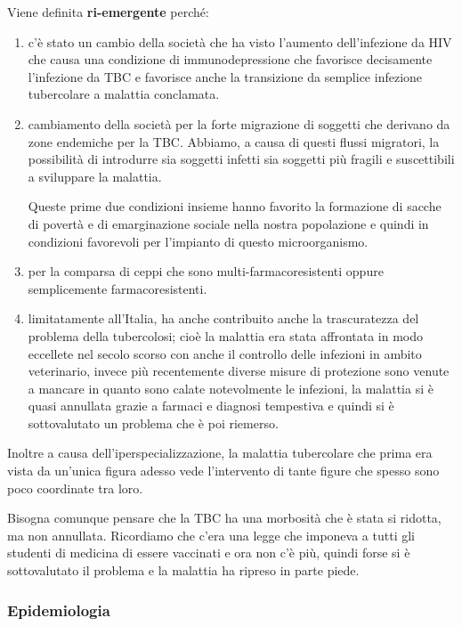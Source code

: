Viene definita \textbf{ri-emergente} perché:
\begin{enumerate}

\item c'è stato un cambio della società che ha visto l'aumento
dell'infezione da HIV che causa una condizione di immunodepressione che
favorisce decisamente l'infezione da TBC e favorisce anche la
transizione da semplice infezione tubercolare a malattia conclamata.

\item cambiamento della società per la forte migrazione di soggetti che
derivano da zone endemiche per la TBC. Abbiamo, a causa di questi flussi
migratori, la possibilità di introdurre sia soggetti infetti sia
soggetti più fragili e suscettibili a sviluppare la malattia.

Queste prime due condizioni insieme hanno favorito la formazione di
sacche di povertà e di emarginazione sociale nella nostra popolazione e
quindi in condizioni favorevoli per l'impianto di questo microorganismo.

\item  per la comparsa di ceppi che sono multi-farmacoresistenti oppure
semplicemente farmacoresistenti.

\item limitatamente all'Italia, ha anche contribuito anche la trascuratezza
del problema della tubercolosi; cioè la malattia era stata affrontata in
modo eccellete nel secolo scorso con anche il controllo delle infezioni
in ambito veterinario, invece più recentemente diverse misure di
protezione sono venute a mancare in quanto sono calate notevolmente le
infezioni, la malattia si è quasi annullata grazie a farmaci e diagnosi
tempestiva e quindi si è sottovalutato un problema che è poi riemerso.
\end{enumerate}
Inoltre a causa dell'iperspecializzazione, la malattia tubercolare che
prima era vista da un'unica figura adesso vede l'intervento di tante
figure che spesso sono poco coordinate tra loro.

Bisogna comunque pensare che la TBC ha una morbosità che è stata si
ridotta, ma non annullata. Ricordiamo che c'era una legge che imponeva a
tutti gli studenti di medicina di essere vaccinati e ora non c'è più,
quindi forse si è sottovalutato il problema e la malattia ha ripreso in
parte piede.

\subsubsection{Epidemiologia}


